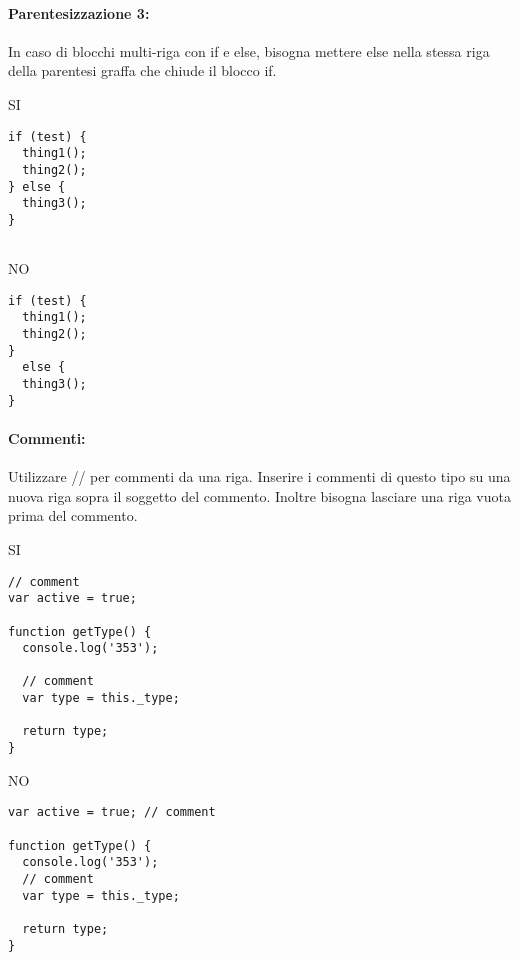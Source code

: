 \documentclass[../processi_primari.tex]{subfiles}
\begin{document}
\paragraph{Parentesizzazione 3:} In caso di blocchi multi-riga con if e else, bisogna mettere else nella stessa riga della parentesi graffa che chiude il blocco if.\\

\begin{minipage}{6cm}
	{\begin{center}SI\end{center}}
	\begin{Verbatim}[frame=single]
if (test) {
  thing1();
  thing2();
} else {
  thing3();
}
	
	\end{Verbatim}
\end{minipage}
\hfill
\begin{minipage}{6cm}
	{\begin{center}NO\end{center}}
	\begin{Verbatim}[frame=single]
if (test) {
  thing1();
  thing2();
}
  else {
  thing3();
}
	\end{Verbatim}
\end{minipage}

\paragraph{Commenti:}Utilizzare // per commenti da una riga. Inserire i commenti di questo tipo su una nuova riga sopra il soggetto del commento. Inoltre bisogna lasciare una riga vuota prima del commento.


\begin{minipage}{6cm}
	{\begin{center}SI\end{center}}
	\begin{Verbatim}[frame=single]
// comment
var active = true;

function getType() {
  console.log('353');

  // comment
  var type = this._type;

  return type;
}
	\end{Verbatim}
\end{minipage}
\hfill
\begin{minipage}{6.5cm}
	{\begin{center}NO\end{center}}
	\begin{Verbatim}[frame=single]
var active = true; // comment

function getType() {
  console.log('353');
  // comment
  var type = this._type;

  return type;
}


	\end{Verbatim}
\end{minipage}
\end{document}
